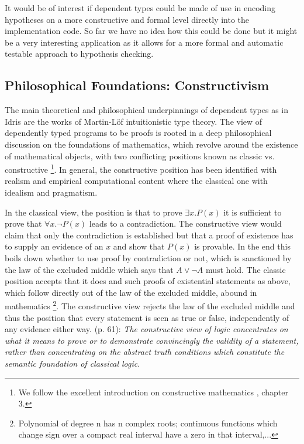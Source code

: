 It would be of interest if dependent types could be made of use in encoding hypotheses on a more constructive and formal level directly into the implementation code. So far we have no idea how this could be done but it might be a very interesting application as it allows for a more formal and automatic testable approach to hypothesis checking.

\subsection{Philosophical Foundations: Constructivism}
\label{sub:dep_foundations}

The main theoretical and philosophical underpinnings of dependent types as in Idris are the works of Martin-L\"of intuitionistic type theory. The view of dependently typed programs to be proofs is rooted in a deep philosophical discussion on the foundations of mathematics, which revolve around the existence of mathematical objects, with two conflicting positions known as classic vs. constructive \footnote{We follow the excellent introduction on constructive mathematics \cite{thompson_type_1991}, chapter 3.}. In general, the constructive position has been identified with realism and empirical computational content where the classical one with idealism and pragmatism.

In the classical view, the position is that to prove $\exists x. P(x)$ it is sufficient to prove that $\forall x. \neg P(x)$ leads to a contradiction. The constructive view would claim that only the contradiction is established but that a proof of existence has to supply an evidence of an $x$ and show that $P(x)$ is provable. In the end this boils down whether to use proof by contradiction or not, which is sanctioned by the law of the excluded middle which says that $A \lor \neg A$ must hold. The classic position accepts that it does and such proofs of existential statements as above, which follow directly out of the law of the excluded middle, abound in mathematics \footnote{Polynomial of degree n has n complex roots; continuous functions which change sign over a compact real interval have a zero in that interval,...}. The constructive view rejects the law of the excluded middle and thus the position that every statement is seen as true or false, independently of any evidence either way. \cite{thompson_type_1991} (p. 61): \textit{The constructive view of logic concentrates on what it means to prove or to demonstrate convincingly the validity of a statement, rather than concentrating on the abstract truth conditions which constitute the semantic foundation of classical logic}.

